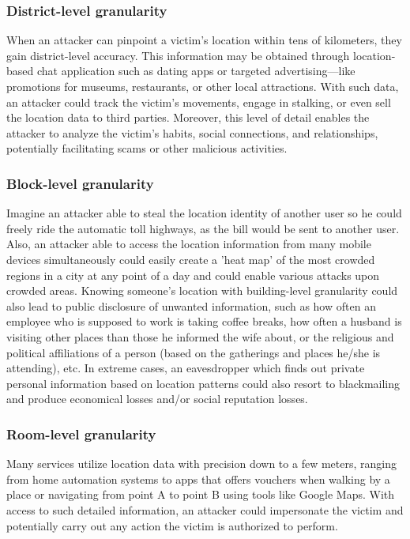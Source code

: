 \documentclass[9pt,conference]{IEEEtran}
\begin{document}
\subsubsection{District-level granularity}
When an attacker can pinpoint a victim’s location within tens of kilometers, they gain district-level accuracy. This information may be obtained through location-based chat application such as dating apps or targeted advertising—like promotions for museums, restaurants, or other local attractions. With such data, an attacker could track the victim’s movements, engage in stalking, or even sell the location data to third parties. Moreover, this level of detail enables the attacker to analyze the victim’s habits, social connections, and relationships, potentially facilitating scams or other malicious activities.

\subsubsection{Block-level granularity}
Imagine an attacker able to steal the location identity of another user so he could freely ride the automatic toll highways, as the bill would be sent to another user. Also, an attacker able to access the location information from many mobile devices simultaneously could easily create a 'heat map' of the most crowded regions in a city at any point of a day and could enable various attacks upon crowded areas. Knowing someone’s location with building-level granularity could also lead to public disclosure of unwanted information, such as how often an employee who is supposed to work is taking coffee breaks, how often a husband is visiting other places than those he informed the wife about, or the religious and political affiliations of a person (based on the gatherings and places he/she is attending), etc. In extreme cases, an eavesdropper which finds out private personal information based on location patterns could also resort to blackmailing and produce economical losses and/or social reputation losses.

\subsubsection{Room-level granularity}
Many services utilize location data with precision down to a few meters, ranging from home automation systems to apps that offers vouchers when walking by a place or navigating from point A to point B using tools like Google Maps. With access to such detailed information, an attacker could impersonate the victim and potentially carry out any action the victim is authorized to perform.
\end{document}

